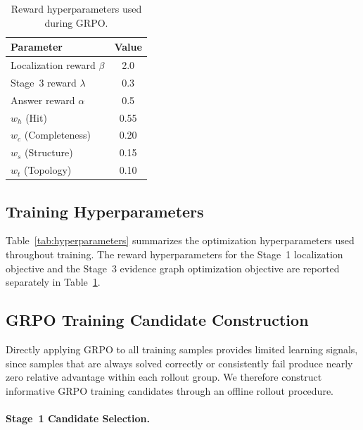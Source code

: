 \documentclass[letterpaper]{article} %
\begin{document}
\begin{table}[t]
\centering

\begin{tabular}{lc}
\toprule
\textbf{Parameter} & \textbf{Value} \\
\midrule
Localization reward $\beta$ & 2.0 \\
Stage~3 reward $\lambda$ & 0.3 \\
Answer reward $\alpha$ & 0.5 \\
$w_h$ (Hit) & 0.55 \\
$w_c$ (Completeness) & 0.20 \\
$w_s$ (Structure) & 0.15 \\
$w_t$ (Topology) & 0.10 \\
\bottomrule
\end{tabular}

\caption{Reward hyperparameters used during GRPO.}
\label{tab:reward_hyper}

\end{table}

\subsection{Training Hyperparameters}

Table~\ref{tab:hyperparameters} summarizes the optimization hyperparameters used throughout training. The reward hyperparameters for the Stage~1 localization objective and the Stage~3 evidence graph optimization objective are reported separately in Table~\ref{tab:reward_hyper}.








\subsection{GRPO Training Candidate Construction}

Directly applying GRPO to all training samples provides limited learning signals, since samples that are always solved correctly or consistently fail produce nearly zero relative advantage within each rollout group. We therefore construct informative GRPO training candidates through an offline rollout procedure.

\paragraph{Stage~1 Candidate Selection.}
\end{document}
